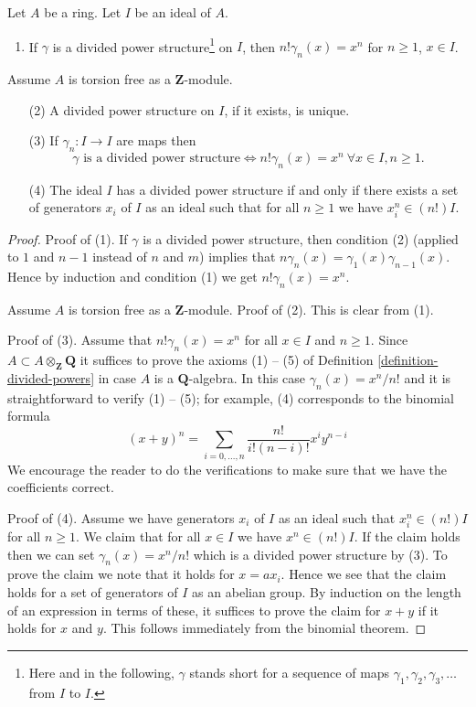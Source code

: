 \begin{lemma}
\label{lemma-silly}
Let $A$ be a ring. Let $I$ be an ideal of $A$.
\begin{enumerate}
\item If $\gamma$ is a divided power structure\footnote{Here
and in the following, $\gamma$ stands short for a sequence
of maps $\gamma_1, \gamma_2, \gamma_3, \ldots$ from $I$ to $I$.}
on $I$, then
$n! \gamma_n(x) = x^n$ for $n \geq 1$, $x \in I$.
\end{enumerate}
Assume $A$ is torsion free as a $\mathbf{Z}$-module.
\begin{enumerate}
\item[(2)] A divided power structure on $I$, if it exists, is unique.
\item[(3)] If $\gamma_n : I \to I$ are maps then
$$
\gamma\text{ is a divided power structure}
\Leftrightarrow
n! \gamma_n(x) = x^n\ \forall x \in I, n \geq 1.
$$
\item[(4)] The ideal $I$ has a divided power structure
if and only if there exists
a set of generators $x_i$ of $I$ as an ideal such that
for all $n \geq 1$ we have $x_i^n \in (n!)I$.
\end{enumerate}
\end{lemma}

\begin{proof}
Proof of (1). If $\gamma$ is a divided power structure, then condition
(2) (applied to $1$ and $n-1$ instead of $n$ and $m$)
implies that $n \gamma_n(x) = \gamma_1(x)\gamma_{n - 1}(x)$. Hence
by induction and condition (1) we get $n! \gamma_n(x) = x^n$.

\medskip\noindent
Assume $A$ is torsion free as a $\mathbf{Z}$-module.
Proof of (2). This is clear from (1).

\medskip\noindent
Proof of (3). Assume that $n! \gamma_n(x) = x^n$ for all $x \in I$ and
$n \geq 1$. Since $A \subset A \otimes_{\mathbf{Z}} \mathbf{Q}$ it suffices
to prove the axioms (1) -- (5) of Definition
\ref{definition-divided-powers} in case $A$ is a $\mathbf{Q}$-algebra.
In this case $\gamma_n(x) = x^n/n!$ and it is straightforward
to verify (1) -- (5); for example, (4) corresponds to the binomial
formula
$$
(x + y)^n = \sum_{i = 0, \ldots, n} \frac{n!}{i!(n - i)!} x^iy^{n - i}
$$
We encourage the reader to do the verifications
to make sure that we have the coefficients correct.

\medskip\noindent
Proof of (4). Assume we have generators $x_i$ of $I$ as an ideal
such that $x_i^n \in (n!)I$ for all $n \geq 1$. We claim that
for all $x \in I$ we have $x^n \in (n!)I$. If the claim holds then
we can set $\gamma_n(x) = x^n/n!$ which is a divided power structure by (3).
To prove the claim we note that it holds for $x = ax_i$. Hence we see
that the claim holds for a set of generators of $I$ as an abelian group.
By induction on the length of an expression in terms of these, it suffices
to prove the claim for $x + y$ if it holds for $x$ and $y$. This
follows immediately from the binomial theorem.
\end{proof}

